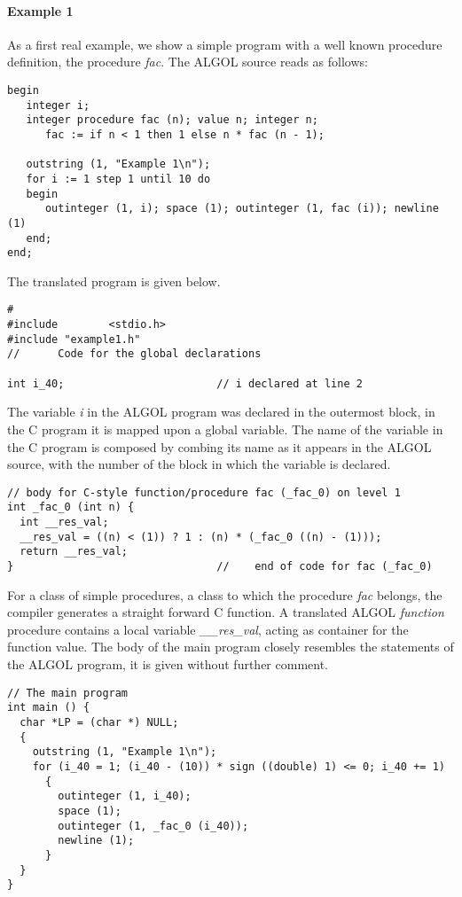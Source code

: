 \documentclass[11pt]{article}
\begin{document}
\paragraph{Example 1}
As a first real example, we show a simple program with a well known procedure
definition, the procedure {\em fac}. The ALGOL source reads as follows:
{\footnotesize
\begin{verbatim}
begin
   integer i;
   integer procedure fac (n); value n; integer n;
      fac := if n < 1 then 1 else n * fac (n - 1);

   outstring (1, "Example 1\n");
   for i := 1 step 1 until 10 do
   begin
      outinteger (1, i); space (1); outinteger (1, fac (i)); newline (1)
   end;
end;
\end{verbatim}
}
The translated program is given below.
{\footnotesize
\begin{verbatim}
#
#include        <stdio.h>
#include "example1.h"
//      Code for the global declarations

int i_40;                        // i declared at line 2
\end{verbatim}
}

The variable {\em i} in the ALGOL program was declared in the outermost
block, in the C program it is mapped upon a global variable.
The name of the variable in the C program is composed by
combing its name as it appears in the ALGOL source,
with the number of the block in which the variable is declared.
{\footnotesize
\begin{verbatim}
// body for C-style function/procedure fac (_fac_0) on level 1
int _fac_0 (int n) {
  int __res_val;
  __res_val = ((n) < (1)) ? 1 : (n) * (_fac_0 ((n) - (1)));
  return __res_val;
}                                //    end of code for fac (_fac_0)
\end{verbatim}
}
For a class of simple procedures, a class to which the procedure {\em fac}
belongs, the compiler generates a straight forward C function.
A translated ALGOL {\em function} procedure contains
a local variable {\em \_\_res\_val}, acting as container for the function
value.
The body of the main program closely resembles
the statements of the ALGOL program, it is given without further comment.
{\footnotesize
\begin{verbatim}
// The main program
int main () {
  char *LP = (char *) NULL;
  {                                
    outstring (1, "Example 1\n");
    for (i_40 = 1; (i_40 - (10)) * sign ((double) 1) <= 0; i_40 += 1)
      {
        outinteger (1, i_40);
        space (1);
        outinteger (1, _fac_0 (i_40));
        newline (1);
      }
  }  
}
\end{verbatim}
}
\end{document}
